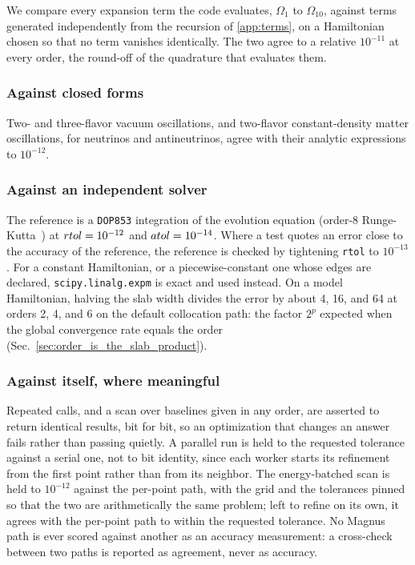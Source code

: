 \documentclass[final,5p,times,twocolumn,sort,compress]{elsarticle}
\makeatletter
\DeclareRobustCommand{\_}{%
  \ifmmode\nfss@text{\textunderscore}\else\textunderscore\allowbreak\fi}
\makeatother
\begin{document}
We compare every expansion term the code evaluates, $\Omega_1$ to $\Omega_{10}$, against terms generated independently from the recursion of \ref{app:terms}, on a Hamiltonian chosen so that no term vanishes identically. The two agree to a relative $10^{-11}$ at every order, the round-off of the quadrature that evaluates them.

\subsubsection{Against closed forms}

Two- and three-flavor vacuum oscillations, and two-flavor constant-density matter oscillations, for neutrinos and antineutrinos, agree with their analytic expressions to $10^{-12}$.

\subsubsection{Against an independent solver}

The reference is a {\tt DOP853} integration of the evolution equation (order-8 Runge-Kutta\ \cite{Prince:1981dop, Hairer:1993sod}) at ${\tt rtol} = 10^{-12}$ and ${\tt atol} = 10^{-14}$. Where a test quotes an error close to the accuracy of the reference, the reference is checked by tightening {\tt rtol} to $10^{-13}$. For a constant Hamiltonian, or a piecewise-constant one whose edges are declared, {\tt scipy.linalg.expm} is exact and used instead. On a model Hamiltonian, halving the slab width divides the error by about 4, 16, and 64 at orders 2, 4, and 6 on the default collocation path: the factor $2^{p}$ expected when the global convergence rate equals the order (Sec.~\ref{sec:order_is_the_slab_product}).

\subsubsection{Against itself, where meaningful}

Repeated calls, and a scan over baselines given in any order, are asserted to return identical results, bit for bit, so an optimization that changes an answer fails rather than passing quietly. A parallel run is held to the requested tolerance against a serial one, not to bit identity, since each worker starts its refinement from the first point rather than from its neighbor. The energy-batched scan is held to $10^{-12}$ against the per-point path, with the grid and the tolerances pinned so that the two are arithmetically the same problem; left to refine on its own, it agrees with the per-point path to within the requested tolerance. No Magnus path is ever scored against another as an accuracy measurement: a cross-check between two paths is reported as agreement, never as accuracy.
\end{document}
